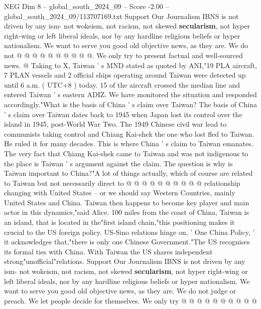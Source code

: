 \begin{textsample}{NEG Dim 8 – global\_south\_2024\_09 – Score -2.00 – global\_south\_2024\_09/113707169.txt}
Support Our Journalism IBNS is not driven by any ism- not wokeism, not racism, not skewed \textbf{secularism}, not hyper right-wing or left liberal ideals, nor by any hardline religious beliefs or hyper nationalism.
We want to serve you good old objective news, as they are.
We do not @ @ @ @ @ @ @ @ @ @.
We only try to present factual and well-sourced news. @ Taking to X, Taiwan ' s MND stated as quoted by ANI,"19 PLA aircraft, 7 PLAN vessels and 2 official ships operating around Taiwan were detected up until 6 a.m. ( UTC+8 ) today. 15 of the aircraft crossed the median line and entered Taiwan ' s eastern ADIZ.
We have monitored the situation and responded accordingly."What is the basis of China ' s claim over Taiwan?
The basis of China ' s claim over Taiwan dates back to 1945 when Japan lost its control over the island in 1945, post-World War Two.
The 1949 Chinese civil war lead to communists taking control and Chiang Kai-shek the one who lost fled to Taiwan.
He ruled it for many decades.
This is where China ' s claim to Taiwan emanates.
The very fact that Chiang Kai-shek came to Taiwan and was not indigenous to the place is Taiwan ' s argument against the claim.
The question is why is Taiwan important to China?"A lot of things actually, which of course are related to Taiwan but not necessarily direct to @ @ @ @ @ @ @ @ @ @ relationship changing with United States -- or we should say Western Countries, mainly United States and China.
Taiwan then happens to become key player and main actor in this dynamics,"said Alice. 100 miles from the coast of China, Taiwan is an island, that is located in the"first island chain,"this positioning makes it crucial to the US foreign policy.
US-Sino relations hinge on, ' One China Policy, ' it acknowledges that,"there is only one Chinese Government."The US recognises its formal ties with China.
With Taiwan the US shares independent strong"unofficial"relations.
Support Our Journalism IBNS is not driven by any ism- not wokeism, not racism, not skewed \textbf{secularism}, not hyper right-wing or left liberal ideals, nor by any hardline religious beliefs or hyper nationalism.
We want to serve you good old objective news, as they are.
We do not judge or preach.
We let people decide for themselves.
We only try @ @ @ @ @ @ @ @ @ @

\end{textsample}
